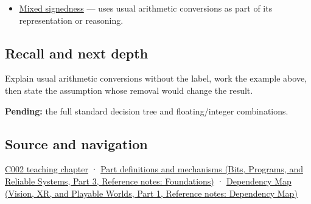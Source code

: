 \hypertarget{appendix-5e2d663adf7f-used-by}{}

\begin{itemize}
\tightlist
\item
  \hyperref[appendix-736a2345de4a]{Mixed signedness} --- uses usual arithmetic conversions as part of its representation or reasoning.
\end{itemize}

\subsection{Recall and next depth}\label{appendix-5e2d663adf7f-recall-and-next-depth}

\hypertarget{appendix-5e2d663adf7f-recall-and-next-depth}{}

Explain usual arithmetic conversions without the label, work the example above, then state the assumption whose removal would change the result.

\textbf{Pending:} the full standard decision tree and floating/integer combinations.

\subsection{Source and navigation}\label{appendix-5e2d663adf7f-source-and-navigation}

\hypertarget{appendix-5e2d663adf7f-source-and-navigation}{}

\hyperref[01-foundations-i-ch001-arithmetic-becomes-a-policy]{C002 teaching chapter} · \href{../01-Bits-Programs-and-Reliable-Systems-P03/main.pdf\#appendix-fd090d982a15}{Part definitions and mechanisms (Bits, Programs, and Reliable Systems, Part 3, Reference notes: Foundations)} · \href{../07-Vision-XR-and-Playable-Worlds-P01/main.pdf\#appendix-4ad47bdd269a}{Dependency Map (Vision, XR, and Playable Worlds, Part 1, Reference notes: Dependency Map)}
